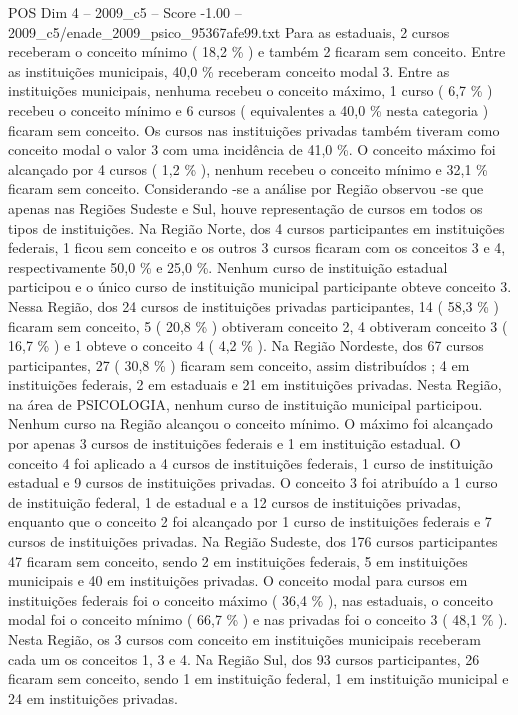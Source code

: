 \begin{textsample}{POS Dim 4 – 2009\_c5 – Score -1.00 – 2009\_c5/enade\_2009\_psico\_95367afe99.txt}
Para as estaduais, 2 cursos receberam o conceito mínimo ( 18,2 \% ) e também 2 ficaram sem conceito.
Entre as instituições municipais, 40,0 \% receberam conceito modal 3.
Entre as instituições municipais, nenhuma recebeu o conceito máximo, 1 curso ( 6,7 \% ) recebeu o conceito mínimo e 6 cursos ( equivalentes a 40,0 \% nesta categoria ) ficaram sem conceito.
Os cursos nas instituições privadas também tiveram como conceito modal o valor 3 com uma incidência de 41,0 \%.
O conceito máximo foi alcançado por 4 cursos ( 1,2 \% ), nenhum recebeu o conceito mínimo e 32,1 \% ficaram sem conceito.
Considerando -se a análise por Região observou -se que apenas nas Regiões Sudeste e Sul, houve representação de cursos em todos os tipos de instituições.
Na Região Norte, dos 4 cursos participantes em instituições federais, 1 ficou sem conceito e os outros 3 cursos ficaram com os conceitos 3 e 4, respectivamente 50,0 \% e 25,0 \%.
Nenhum curso de instituição estadual participou e o único curso de instituição municipal participante obteve conceito 3.
Nessa Região, dos 24 cursos de instituições privadas participantes, 14 ( 58,3 \% ) ficaram sem conceito, 5 ( 20,8 \% ) obtiveram conceito 2, 4 obtiveram conceito 3 ( 16,7 \% ) e 1 obteve o conceito 4 ( 4,2 \% ).
Na Região Nordeste, dos 67 cursos participantes, 27 ( 30,8 \% ) ficaram sem conceito, assim distribuídos ; 4 em instituições federais, 2 em estaduais e 21 em instituições privadas.
Nesta Região, na área de PSICOLOGIA, nenhum curso de instituição municipal participou.
Nenhum curso na Região alcançou o conceito mínimo.
O máximo foi alcançado por apenas 3 cursos de instituições federais e 1 em instituição estadual.
O conceito 4 foi aplicado a 4 cursos de instituições federais, 1 curso de instituição estadual e 9 cursos de instituições privadas.
O conceito 3 foi atribuído a 1 curso de instituição federal, 1 de estadual e a 12 cursos de instituições privadas, enquanto que o conceito 2 foi alcançado por 1 curso de instituições federais e 7 cursos de instituições privadas.
Na Região Sudeste, dos 176 cursos participantes 47 ficaram sem conceito, sendo 2 em instituições federais, 5 em instituições municipais e 40 em instituições privadas.
O conceito modal para cursos em instituições federais foi o conceito máximo ( 36,4 \% ), nas estaduais, o conceito modal foi o conceito mínimo ( 66,7 \% ) e nas privadas foi o conceito 3 ( 48,1 \% ).
Nesta Região, os 3 cursos com conceito em instituições municipais receberam cada um os conceitos 1, 3 e 4.
Na Região Sul, dos 93 cursos participantes, 26 ficaram sem conceito, sendo 1 em instituição federal, 1 em instituição municipal e 24 em instituições privadas.

\end{textsample}
